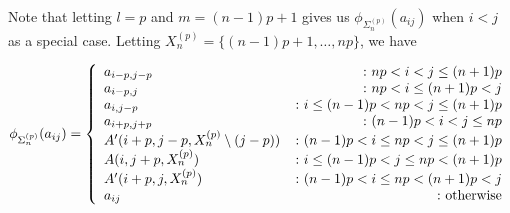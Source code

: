 \documentclass[11pt]{amsart}
\begin{document}
\noindent Note that letting $l=p$ and $m=(n-1)p+1$ gives us $\phi_{\Sigma_n^{(p)}}(a_{ij})$ when $i<j$ as a special case.  Letting $X_n^{(p)} = \{(n-1)p+1,\ldots,np\}$, we have

$$
\phi_{\Sigma_n^{(p)}}(a_{ij}) =
\left\{
     \begin{array}{lr}
       a_{i-p,j-p} & \colon np< i<j\le (n+1)p\\
       a_{i-p,j} &\colon np< i\le (n+1)p< j\\
       a_{i,j-p} & \colon i\le(n-1)p<np< j\le(n+1)p\\
       a_{i+p,j+p} &\colon (n-1)p< i<j\le np\\
       A'(i+p,j-p,X_n^{(p)}\setminus (j-p)) & \colon (n-1)p< i\le np< j \le (n+1)p\\
       A(i,j+p,X_n^{(p)}) & \colon i\le(n-1)p< j \le np<(n+1)p\\
       A'(i+p,j,X_n^{(p)}) & \colon (n-1)p< i \le np<(n+1)p< j\\
       a_{ij} & \colon \textnormal{otherwise}
     \end{array}
\right.
$$
\end{document}
